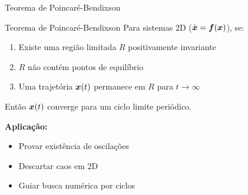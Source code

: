 \begin{frame}[allowframebreaks]{Teorema de Poincaré-Bendixson}
\begin{block}{Teorema de Poincaré-Bendixson}
Para sistemas 2D ($\dot{\boldsymbol{x}} = \boldsymbol{f}(\boldsymbol{x})$), se:
\begin{enumerate}
    \item Existe uma região limitada $R$ positivamente invariante
    \item $R$ não contém pontos de equilíbrio
    \item Uma trajetória $\boldsymbol{x}(t)$ permanece em $R$ para $t \to \infty$
\end{enumerate}
Então $\boldsymbol{x}(t)$ converge para um ciclo limite periódico.
\end{block}

\vspace{0.3cm}


\vspace{0.3cm}

\textbf{Aplicação:}
\begin{itemize}
    \item Provar existência de oscilações
    \item Descartar caos em 2D
    \item Guiar busca numérica por ciclos
\end{itemize}
\end{frame}


